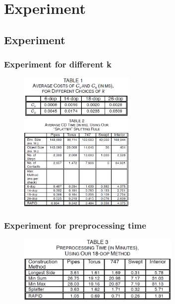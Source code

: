 \documentclass{beamer}
\begin{document}
\section{Experiment}

\subsection{Experiment}
	\begin{frame}
	\frametitle{Experiment for different k}
	\begin{figure}[h!]
		\centering
		\includegraphics[width=0.5\textwidth]{./figure/TABLE1.PNG}
		\includegraphics[width=0.5\textwidth]{./figure/TABLE2.PNG}
	\end{figure}
	\end{frame}

	\begin{frame}
	\frametitle{Experiment for preprocessing time}
	\begin{figure}[h!]
		\centering
		\includegraphics[width=0.7\textwidth]{./figure/TABLE3.PNG}
	\end{figure}
	\end{frame}
\end{document}
